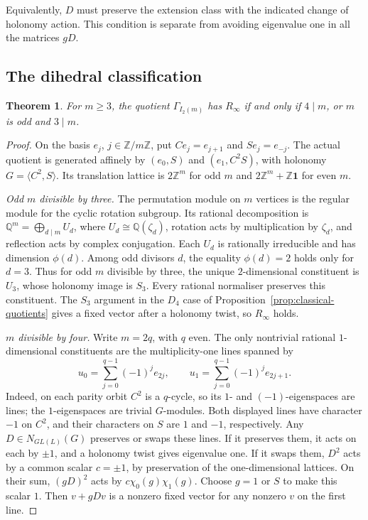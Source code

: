 \documentclass[11pt]{amsart}
\newtheorem{theorem}{Theorem}[section]
\theoremstyle{definition}
\newcommand{\Z}{\mathbb{Z}}
\newcommand{\Q}{\mathbb{Q}}
\newcommand{\Rinf}{R_\infty}
\begin{document}
Equivalently, $D$ must preserve the extension class with the indicated change of holonomy action.
This condition is separate from avoiding eigenvalue one in all the matrices $gD$.

\subsection{The dihedral classification}\label{sec:dihedral-classification}

\begin{theorem}\label{thm:dihedral-classification}
For $m\ge3$, the quotient $\Gamma_{I_2(m)}$ has $\Rinf$ if and only if $4\mid m$, or $m$ is odd and $3\mid m$.
\end{theorem}
\begin{proof}
On the basis $e_j$, $j\in\Z/m\Z$, put $Ce_j=e_{j+1}$ and $Se_j=e_{-j}$.
The actual quotient is generated affinely by $(e_0,S)$ and $(e_1,C^2S)$, with holonomy
$G=\langle C^2,S\rangle$. Its translation lattice is $2\Z^m$ for odd $m$ and
$2\Z^m+\Z\mathbf1$ for even $m$.

\emph{Odd $m$ divisible by three.} The permutation module on $m$ vertices is the regular module for the cyclic rotation subgroup.
Its rational decomposition is $\Q^m=\bigoplus_{d\mid m}U_d$, where $U_d\cong\Q(\zeta_d)$,
rotation acts by multiplication by $\zeta_d$, and reflection acts by complex conjugation.
Each $U_d$ is rationally irreducible and has dimension $\phi(d)$.
Among odd divisors $d$, the equality $\phi(d)=2$ holds only for $d=3$.
Thus for odd $m$ divisible by three, the unique $2$-dimensional constituent is $U_3$, whose holonomy image is $S_3$.
Every rational normaliser preserves this constituent. The $S_3$ argument in the $D_4$ case of
Proposition~\ref{prop:classical-quotients} gives a fixed vector after a holonomy twist, so $\Rinf$ holds.

\emph{$m$ divisible by four.} Write $m=2q$, with $q$ even. The only nontrivial rational
$1$-dimensional constituents are the multiplicity-one lines spanned by
\[
 u_0=\sum_{j=0}^{q-1}(-1)^j e_{2j},\qquad
 u_1=\sum_{j=0}^{q-1}(-1)^j e_{2j+1}.
\]
Indeed, on each parity orbit $C^2$ is a $q$-cycle, so its $1$- and $(-1)$-eigenspaces are lines;
the $1$-eigenspaces are trivial $G$-modules. Both displayed lines have character $-1$ on $C^2$,
and their characters on $S$ are $1$ and $-1$, respectively.
Any $D\in N_{GL(L)}(G)$ preserves or swaps these lines. If it preserves them, it acts on each by $\pm1$,
and a holonomy twist gives eigenvalue one. If it swaps them, $D^2$ acts by a common scalar $c=\pm1$,
by preservation of the one-dimensional lattices. On their sum, $(gD)^2$ acts by
$c\chi_0(g)\chi_1(g)$. Choose $g=1$ or $S$ to make this scalar $1$.
Then $v+gDv$ is a nonzero fixed vector for any nonzero $v$ on the first line.


\end{proof}
\end{document}
